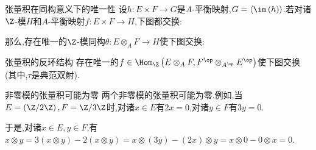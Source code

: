 \begin{corollary}{张量积在同构意义下的唯一性}{}
	设$h:E\times F\to G$是$A$-平衡映射,$G=\langle\im\left(h\right)\rangle$.若对诸$\Z$-模$H$和$A$-平衡映射$f:E\times F\to H$,下图都交换:
	\begin{center}
	\end{center}
	那么,存在唯一的$\Z$-模同构$\theta:E\otimes_{A}F\to H$使下图交换:
	\begin{center}
	\end{center}
\end{corollary}

\begin{corollary}{张量积的反环结构}{}
	存在唯一的$f\in\Hom_{\Z}\left(E\otimes_{A}F,F^{\op}\otimes_{A^{\op}}E^{\op}\right)$使下图交换(其中,$\tau$是典范双射).
	\begin{center}
	\end{center}
\end{corollary}

\begin{remark}{非零模的张量积可能为零}{}
	两个非零模的张量积可能为零.例如,当$E=\left(\Z/2\Z\right),F=\Z/3\Z$时,对诸$x\in E$有$2x=0$,对诸$y\in F$有$3y=0$.
	
	
	于是,对诸$x\in E,y\in F$,有$x\otimes y=3\left(x\otimes y\right)-2\left(x\otimes y\right)=x\otimes\left(3y\right)-\left(2x\right)\otimes y=x\otimes 0-0\otimes x=0$.
\end{remark}

